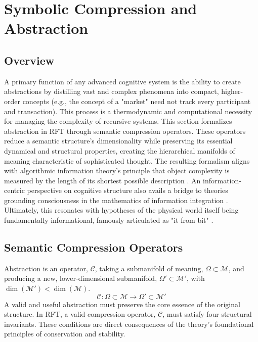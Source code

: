 \chapter{Symbolic Compression and Abstraction}

\section{Overview}

A primary function of any advanced cognitive system is the ability to create abstractions by distilling vast and complex phenomena into compact, higher-order concepts (e.g., the concept of a "market" need not track every participant and transaction). This process is a thermodynamic and computational necessity for managing the complexity of recursive systems. This section formalizes abstraction in RFT through semantic compression operators. These operators reduce a semantic structure's dimensionality while preserving its essential dynamical and structural properties, creating the hierarchical manifolds of meaning characteristic of sophisticated thought. The resulting formalism aligns with algorithmic information theory's principle that object complexity is measured by the length of its shortest possible description \autocite{Kolmogorov1965, Chaitin1966}. An information-centric perspective on cognitive structure also avails a bridge to theories grounding consciousness in the mathematics of information integration \autocite{Tononi2004}. Ultimately, this resonates with hypotheses of the physical world itself being fundamentally informational, famously articulated as "it from bit" \autocite{Wheeler1990}.

\section{Semantic Compression Operators}

Abstraction is an operator, \(\mathcal{C}\), taking a submanifold of meaning, \(\Omega \subset \mathcal{M}\), and producing a new, lower-dimensional submanifold, \(\Omega' \subset \mathcal{M}'\), with \(\dim(\mathcal{M}') < \dim(\mathcal{M})\).
\begin{equation}
\mathcal{C}: \Omega \subset \mathcal{M} \longrightarrow \Omega' \subset \mathcal{M}'
\end{equation}
A valid and useful abstraction must preserve the core essence of the original structure. In RFT, a valid compression operator, \(\mathcal{C}\), must satisfy four structural invariants. These conditions are direct consequences of the theory's foundational principles of conservation and stability.

